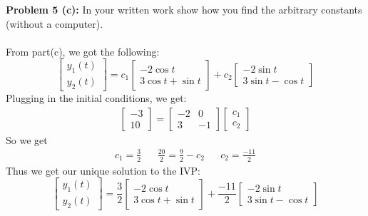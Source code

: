 \documentclass[12pt]{article}
\begin{document}
\newpage 	
\noindent \textbf{Problem 5 (c): }In your written work show how you find the arbitrary constants (without a computer).
\\ \\
From part(c), we got the following:
$$
\begin{bmatrix} y_1(t) \\ y_2(t) \end{bmatrix} =
c_1\begin{bmatrix}
-2\cos t \\
3\cos t + \sin t
\end{bmatrix} +
c_2 \begin{bmatrix}
-2\sin t \\
3\sin t - \cos t
\end{bmatrix}
$$
Plugging in the initial conditions, we get:
	\begin{align*}
		\begin{bmatrix}
			-3 \\ 10			
		\end{bmatrix} = 
		\begin{bmatrix}
			-2 & 0 \\
			3 & -1
		\end{bmatrix}
		\begin{bmatrix}
			c_1 \\ c_2
		\end{bmatrix}
	\end{align*}
So we get
	\begin{align*}
		c_1 = \frac{3}{2} &&
		\frac{20}{2} = \frac{9}{2} - c_2 &&
 		c_2 = \frac{-11}{2}
	\end{align*}
Thus we get our unique solution to the IVP:
	$$
	\begin{bmatrix} y_1(t) \\ y_2(t) \end{bmatrix} =
	\frac{3}{2}\begin{bmatrix}
		-2\cos t \\
		3\cos t + \sin t
	\end{bmatrix} +
	\frac{-11}{2} \begin{bmatrix}
		-2\sin t \\
		3\sin t - \cos t
	\end{bmatrix}
	$$
	
\vspace{\baselineskip}
\vspace{\baselineskip}
\vspace{\baselineskip}
\end{document}
